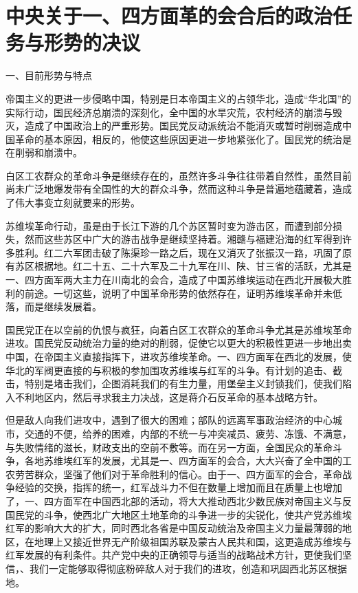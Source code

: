 \section[中央关于一、四方面革的会合后的政治任务与形势的决议（一九三五年八月五日）]{中央关于一、四方面革的会合后的政治任务与形势的决议}


一、目前形势与特点

帝国主义的更进一步侵略中国，特别是日本帝国主义的占领华北，造成“华北国”的实际行动，国民经济总崩溃的深刻化，全中国的水旱灾荒，农村经济的崩溃与毁灭，造成了中国政治上的严重形势。国民党反动派统治不能消灭或暂时削弱造成中国革命的基本原因，相反的，他使这些原因更进一步地紧张化了。国民党的统治是在削弱和崩溃中。

白区工农群众的革命斗争是继续存在的，虽然许多斗争往往带着自然性，虽然目前尚未广泛地爆发带有全国性的大的群众斗争，然而这种斗争是普遍地蕴藏着，造成了伟大事变立刻就要来的形势。

苏维埃革命行动，虽是由于长江下游的几个苏区暂时变为游击区，而遭到部分损失，然而这些苏区中广大的游击战争是继续坚持着。湘赣与福建沿海的红军得到许多胜利。红二六军团击破了陈渠珍一路之后，现在又消灭了张振汉一路，巩固了原有苏区根据地。红二十五、二十六军及二十九军在川、陕、甘三省的活跃，尤其是一、四方面军两大主力在川南北的会合，造成了中国苏维埃运动在西北开展极大胜利的前途。一切这些，说明了中国革命形势的依然存在，证明苏维埃革命并未低落，而是继续发展着。

国民党正在以空前的仇恨与疯狂，向着白区工农群众的革命斗争尤其是苏维埃革命进攻。国民党反动统治力量的绝对的削弱，促使它以更大的积极性更进一步地出卖中国，在帝国主义直接指挥下，进攻苏维埃革命。一、四方面军在西北的发展，使华北的军阀更直接的与积极的参加围攻苏维埃与红军的斗争。有计划的追击、截击，特别是堵击我们，企图消耗我们的有生力量，用堡垒主义封锁我们，使我们陷入不利地区内，然后寻求我主力决战，这是蒋介石反革命的基本战略方针。

但是敌人向我们进攻中，遇到了很大的困难；部队的远离军事政治经济的中心城市，交通的不便，给养的困难，内部的不统一与冲突减员、疲劳、冻饿、不满意，与失败情绪的滋长，财政支出的空前不敷等。而在另一方面，全国民众的革命斗争，各地苏维埃红军的发展，尤其是一、四方面军的会合，大大兴奋了全中国的工农劳苦群众，坚强了他们对于革命胜利的信心。由于一、四方面军的会合，革命战争经验的交换，指挥的统一，红军战斗力不但在数量上增加而且在质量上也增加了，一、四方面军在中国西北部的活动，将大大推动西北少数民族对帝国主义与反国民党的斗争，使西北广大地区土地革命的斗争进一步的尖锐化，使共产党苏维埃红军的影响大大的扩大，同时西北各省是中国反动统治及帝国主义力量最薄弱的地区，在地理上又接近世界无产阶级祖国苏联及蒙古人民共和国，这更造成苏维埃与红军发展的有利条件。共产党中央的正确领导与适当的战略战术方针，更使我们坚信，、我们一定能够取得彻底粉碎敌人对于我们的进攻，创造和巩固西北苏区根据地。

